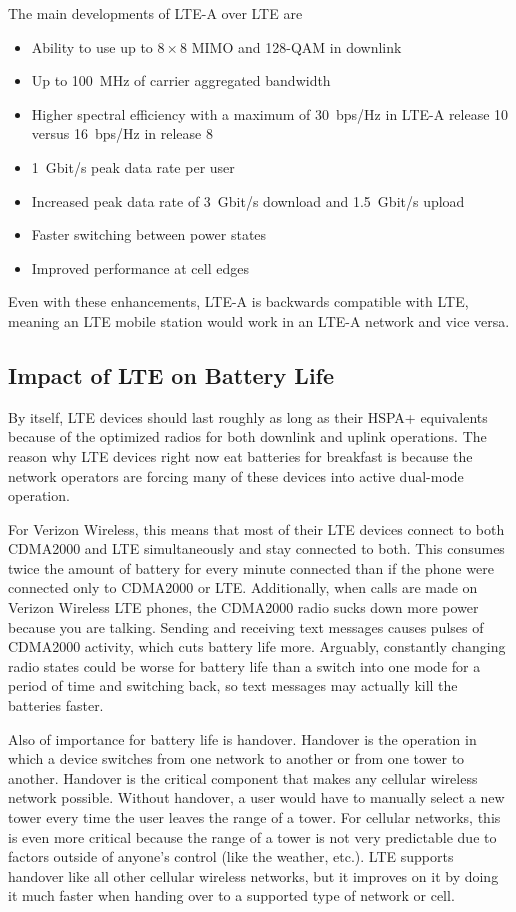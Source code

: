 The main developments of LTE-A over LTE are~\cite{TR36_912}
\begin{itemize}
\item Ability to use up to $8\times8$ MIMO and 128-QAM in downlink
\item Up to 100~MHz of carrier aggregated bandwidth
\item Higher spectral efficiency with a maximum of 30~bps/Hz in LTE-A release 10 versus 16~bps/Hz in release 8
\item 1~Gbit/s peak data rate per user
\item Increased peak data rate of 3~Gbit/s download and 1.5~Gbit/s upload
\item Faster switching between power states
\item Improved performance at cell edges
\end{itemize}
Even with these enhancements, LTE-A is backwards compatible with LTE, meaning an LTE mobile station would work in an LTE-A network and vice versa.

\subsection{Impact of LTE on Battery Life}

By itself, LTE devices should last roughly as long as their HSPA+ equivalents because of the optimized radios for both downlink and uplink operations. The reason why LTE devices right now eat batteries for breakfast is because the network operators are forcing many of these devices into active dual-mode operation.

For Verizon Wireless, this means that most of their LTE devices connect to both CDMA2000 and LTE simultaneously and stay connected to both. This consumes twice the amount of battery for every minute connected than if the phone were connected only to CDMA2000 or LTE. Additionally, when calls are made on Verizon Wireless LTE phones, the CDMA2000 radio sucks down more power because you are talking. Sending and receiving text messages causes pulses of CDMA2000 activity, which cuts battery life more. Arguably, constantly changing radio states could be worse for battery life than a switch into one mode for a period of time and switching back, so text messages may actually kill the batteries faster.

Also of importance for battery life is handover. Handover is the operation in which a device switches from one network to another or from one tower to another. Handover is the critical component that makes any cellular wireless network possible. Without handover, a user would have to manually select a new tower every time the user leaves the range of a tower. For cellular networks, this is even more critical because the range of a tower is not very predictable due to factors outside of anyone’s control (like the weather, etc.). LTE supports handover like all other cellular wireless networks, but it improves on it by doing it much faster when handing over to a supported type of network or cell.